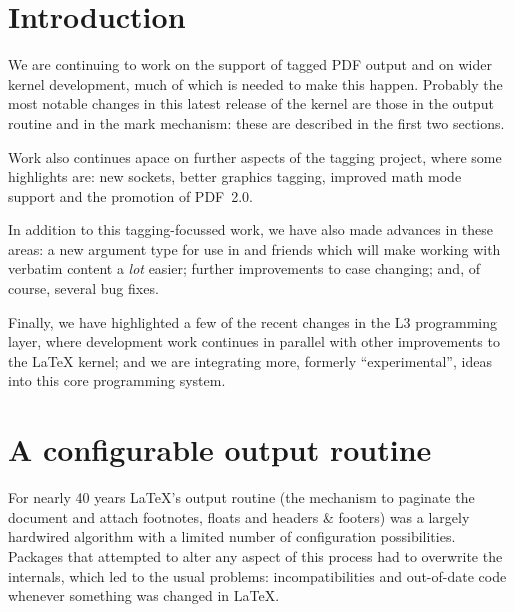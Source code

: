 \documentclass{ltnews}
\begin{document}
\maketitle
{  \spaceskip=3.33pt 
 \small
\tableofcontents}

\setlength{}

\medskip

\section{Introduction}

We are continuing to work on the support of tagged PDF output and on
wider kernel development, much of which is needed to make this
happen.  Probably the most notable changes in this latest release of
the kernel are those in the output routine and in the mark mechanism:
these are described in the first two sections.

Work also continues apace on further aspects of the tagging project,
where some highlights are: new sockets, better graphics tagging,
improved math mode support and the promotion of PDF~2.0.

In addition to this tagging-focussed work, we have also made advances
in these areas: a new argument type for use in
 and friends which will make working with
verbatim content a \emph{lot} easier; further improvements to case
changing; and, of course, several bug fixes.

Finally, we have highlighted a few of the recent changes in the L3
programming layer, where development work continues in parallel with
other improvements to the \LaTeX{} kernel; and we are integrating
more, formerly \enquote{experimental}, ideas into this core
programming system.



\section{A configurable output routine}

For nearly 40 years \LaTeX's output routine (the mechanism to paginate
the document and attach footnotes, floats and headers \& footers) was
a largely hardwired algorithm with a limited number of configuration
possibilities.  Packages that attempted to alter any aspect of this
process had to overwrite the internals, which led to the usual
problems: incompatibilities and out-of-date code whenever something
was changed in \LaTeX{}.
\end{document}

